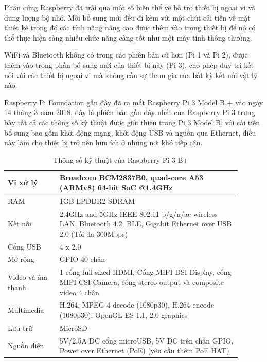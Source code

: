 \documentclass{article}
\begin{document}
Phần cứng Raspberry đã trải qua một số biến thể về hỗ trợ thiết bị ngoại vi và dung lượng bộ nhớ. Mỗi bổ sung mới đều đi kèm với một chút cải tiến về mặt thiết kế trong đó các tính năng nâng cao được thêm vào trong thiết bị để nó có thể thực hiện càng nhiều chức năng càng tốt như một máy tính thông thường.

WiFi và Bluetooth không có trong các phiên bản cũ hơn (Pi 1 và Pi 2), được thêm vào trong phần bổ sung mới của thiết bị này (Pi 3), cho phép duy trì kết nối với các thiết bị ngoại vi mà không cần sự tham gia của bất kỳ kết nối vật lý nào.

Raspberry Pi Foundation gần đây đã ra mắt Raspberry Pi 3 Model B + vào ngày 14 tháng 3 năm 2018, đây là phiên bản gần đây nhất của Raspberry Pi 3 trưng bày tất cả các thông số kỹ thuật được giới thiệu trong Pi 3 Model B, với cải tiến bổ sung bao gồm khởi động mạng, khởi động USB và nguồn qua Ethernet, điều này làm cho thiết bị trở nên hữu ích ở những nơi khó tiếp cận.

\begin{table}[ht]
    \centering
    \begin{tabular}{p{0.2\linewidth}|p{0.7\linewidth}}
    \hline
       Vi xử lý & Broadcom BCM2837B0, quad-core A53 (ARMv8) 64-bit SoC @1.4GHz \\
    \hline
       RAM  &  1GB LPDDR2 SDRAM \\
    \hline
       Kết nối  &  2.4GHz and 5GHz IEEE 802.11 b/g/n/ac wireless LAN, Bluetooth 4.2, BLE, Gigabit Ethernet over USB 2.0 (Tối đa 300Mbps) \\
    \hline
       Cổng USB  &  4 x 2.0 \\
    \hline
       Mở rộng  &  GPIO 40 chân \\
    \hline
       Video và âm thanh  &  1 cổng full-sized HDMI, Cổng MIPI DSI Display, cổng MIPI CSI Camera, cổng stereo output và composite video 4 chân \\
    \hline
       Multimedia  &  H.264, MPEG-4 decode (1080p30), H.264 encode (1080p30); OpenGL ES 1.1, 2.0 graphics \\
    \hline
       Lưu trữ  &  MicroSD \\
    \hline
       Nguồn điện  &  5V/2.5A DC cổng microUSB, 5V DC trên chân GPIO, Power over Ethernet (PoE)  (yêu cầu thêm PoE HAT) \\
    \hline
    \end{tabular}
    \caption{Thông số kỹ thuật của Raspberry Pi 3 B+}
    \label{tab:my_label}
\end{table}
\end{document}
